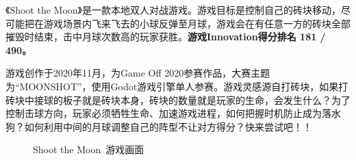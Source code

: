 

《Shoot the Moon》是一款本地双人对战游戏。游戏目标是控制自己的砖块移动，尽可能把在游戏场景内飞来飞去的小球反弹至月球，游戏会在有任意一方的砖块全部摧毁时结束，击中月球次数高的玩家获胜。\textbf{游戏Innovation得分排名 181 / 490。}

游戏创作于2020年11月，为Game Off 2020参赛作品，大赛主题为“MOONSHOT”，使用Godot游戏引擎单人参赛。游戏灵感源自打砖块，如果打砖块中接球的板子就是砖块本身，砖块的数量就是玩家的生命，会发生什么？为了控制击球方向，玩家必须牺牲生命、加速游戏进程，如何把握时机防止成为落水狗？如何利用中间的月球调整自己的阵型不让对方得分？快来尝试吧！！

\begin{figure}[H]
\centering  %

\caption{Shoot the Moon\ 游戏画面}
\end{figure}


